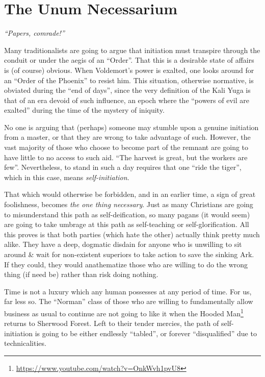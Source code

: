 \section{The Unum Necessarium}

\emph{``Papers, comrade!''}


Many traditionalists are going to argue that initiation must transpire through the conduit or under the aegis of an ``Order''. That this is a desirable state of affairs is (of course) obvious. When Voldemort's power is exalted, one looks around for an ``Order of the Phoenix'' to resist him. This situation, otherwise normative, is obviated during the ``end of days'', since the very definition of the Kali Yuga is that of an era devoid of such influence, an epoch where the ``powers of evil are exalted'' during the time of the mystery of iniquity.

No one is arguing that (perhaps) someone may stumble upon a genuine initiation from a master, or that they are wrong to take advantage of such. However, the vast majority of those who choose to become part of the remnant are going to have little to no access to such aid. ``The harvest is great, but the workers are few''. Nevertheless, to stand in such a day requires that one ``ride the tiger'', which in this case, means \emph{self-initiation}.

That which would otherwise be forbidden, and in an earlier time, a sign of great foolishness, becomes \emph{the one thing necessary}. Just as many Christians are going to misunderstand this path as self-deification, so many pagans (it would seem) are going to take umbrage at this path as self-teaching or self-glorification. All this proves is that both parties (which hate the other) actually think pretty much alike. They have a deep, dogmatic disdain for anyone who is unwilling to sit around \& wait for non-existent superiors to take action to save the sinking Ark. If they could, they would anathematize those who are willing to do the wrong thing (if need be) rather than risk doing nothing.

Time is not a luxury which any human possesses at any period of time. For us, far less so. The ``Norman'' class of those who are willing to fundamentally allow business as usual to continue are not going to like it when the Hooded Man\footnote{\url{https://www.youtube.com/watch?v=OnkWvh1pvU8}} returns to Sherwood Forest. Left to their tender mercies, the path of self-initiation is going to be either endlessly ``tabled'', or forever ``disqualified'' due to technicalities.

